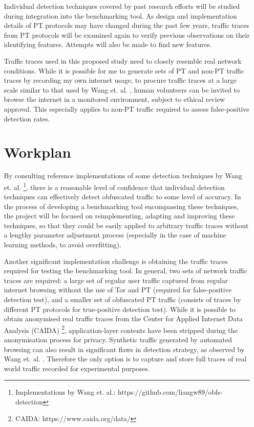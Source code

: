 \documentclass[11pt]{article}
\begin{document}
Individual detection techniques covered by past research efforts will be studied during integration into the benchmarking tool. As design and implementation details of PT protocols may have changed during the past few years, traffic traces from PT protocols will be examined again to verify previous observations on their identifying features. Attempts will also be made to find new features.

Traffic traces used in this proposed study need to closely resemble real network conditions. While it is possible for me to generate sets of PT and non-PT traffic traces by recording my own internet usage, to procure traffic traces at a large scale similar to that used by Wang et. al. \cite{wang2015seeing}, human volunteers can be invited to browse the internet in a monitored environment, subject to ethical review approval. This especially applies to non-PT traffic required to assess false-positive detection rates.


\section{Workplan}

By consulting reference implementations of some detection techniques by Wang et. al. \cite{wang2015seeing} \footnote{Implementations by Wang et. al.: https://github.com/liangw89/obfs-detection}, there is a reasonable level of confidence that individual detection techniques can effectively detect obfuscated traffic to some level of accuracy.  In the process of developing a benchmarking tool encompassing these techniques, the project will be focused on reimplementing, adapting and improving these techniques, so that they could be easily applied to arbitrary traffic traces without a lengthy parameter adjustment process (especially in the case of machine learning methods, to avoid overfitting). 

Another significant implementation challenge is obtaining the traffic traces required for testing the benchmarking tool. In general, two sets of network traffic traces are required: a large set of regular user traffic captured from regular internet browsing without the use of Tor and PT (required for false-positive detection test), and a smaller set of obfuscated PT traffic (consists of traces by different PT protocols for true-positive detection test). While it is possible to obtain anonymised real traffic traces from the Center for Applied Internet Data Analysis (CAIDA) \footnote{CAIDA: https://www.caida.org/data/}, application-layer contents have been stripped during the anonymisation process for privacy. Synthetic traffic generated by automated browsing can also result in significant flaws in detection strategy, as observed by Wang et. al. \cite[Sec. 6.1]{wang2015seeing}. Therefore the only option is to capture and store full traces of real world traffic recorded for experimental purposes.
\end{document}
